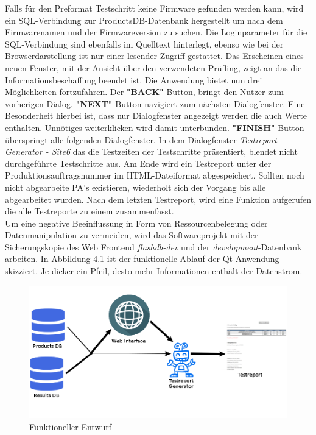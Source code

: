 Falls für den Preformat Testschritt keine Firmware gefunden werden kann, wird ein SQL-Verbindung zur ProductsDB-Datenbank hergestellt um nach dem Firmwarenamen und der Firmwareversion zu suchen. Die Loginparameter für die SQL-Verbindung sind ebenfalls im Quelltext hinterlegt, ebenso wie bei der Browserdarstellung ist nur einer lesender Zugriff gestattet. Das Erscheinen eines neuen Fenster, mit der Ansicht über den verwendeten Prüfling, zeigt an das die Informationsbeschaffung beendet ist. Die Anwendung bietet nun drei Möglichkeiten fortzufahren. Der \textbf{"BACK"}-Button, bringt den Nutzer zum vorherigen Dialog. \textbf{"NEXT"}-Button navigiert zum nächsten Dialogfenster. Eine Besonderheit hierbei ist, dass nur Dialogfenster angezeigt werden die auch Werte enthalten. Unnötiges weiterklicken wird damit unterbunden. \textbf{"FINISH"}-Button überspringt alle folgenden Dialogfenster. In dem Dialogfenster \textit{Testreport Generator - Site6} das die Testzeiten der Testschritte präsentiert, blendet nicht durchgeführte Testschritte aus. Am Ende wird ein Testreport unter der Produktionsauftragsnummer im \ac{HTML}-Dateiformat abgespeichert. Sollten noch nicht abgearbeite \ac{PA}'s existieren, wiederholt sich der Vorgang bis alle abgearbeitet wurden. Nach dem letzten Testreport, wird eine Funktion aufgerufen die alle Testreporte zu einem zusammenfasst. \\
Um eine negative Beeinflussung in Form von Ressourcenbelegung oder Datenmanipulation zu vermeiden, wird das Softwareprojekt mit der Sicherungskopie des Web Frontend \textit{flashdb-dev} und der \textit{development}-Datenbank arbeiten.
In Abbildung 4.1 ist der funktionelle Ablauf der Qt-Anwendung skizziert. Je dicker ein Pfeil, desto mehr Informationen enthält der Datenstrom.

\begin{figure}[H]
\includegraphics[scale=0.44]{images/funktionell}
\caption{Funktioneller Entwurf}
\label{fig:Entwurf funktioneller Ablauf}
\end{figure}

